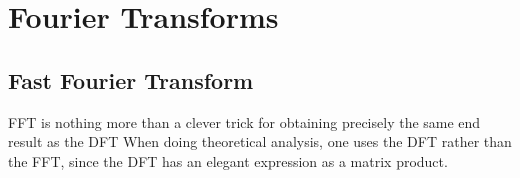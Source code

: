 
\chapter{Fourier Transforms}


\section{Fast Fourier Transform}

FFT is nothing more than a clever trick for obtaining precisely the same end result as the DFT
When doing theoretical analysis, one uses the DFT rather than the FFT, since the DFT
has an elegant expression as a matrix product.